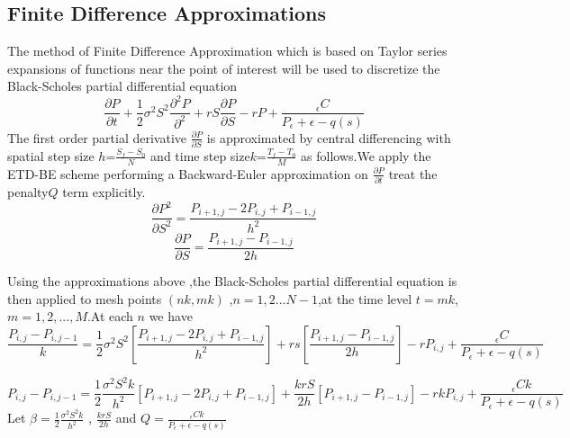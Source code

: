 \documentclass[12pt]{article}
\numberwithin{equation}{section} %
\begin{document}
\subsection{Finite Difference Approximations}
 The method  of Finite Difference Approximation which is based on Taylor series expansions
of functions near the point of interest will be used to discretize
the Black-Scholes partial differential equation\cite{Wilmot}
\begin{equation}
\frac{\partial P}{\partial t}+\frac{1}{2}\sigma^2
S^2\frac{\partial^2 P}{\partial ^2}+rS\frac{\partial P}{\partial
S}-rP +\frac{_{\epsilon}C}{P_{\epsilon}+\epsilon-q(s)}
\end{equation}
 The first order partial derivative $\frac{\partial P}{\partial S}$ is approximated by central differencing
 with spatial step size $h$=$\frac{S_{f}-S_{0}}{N}$ and time step size$k$=$\frac{T_{f}-T_{0}}{M}$ as
 follows.We apply the ETD-BE scheme  performing  a Backward-Euler approximation on
 $\frac{\partial P}{\partial t}$ treat the penalty$Q$ term explicitly.
 \begin{equation*}
\frac{\partial P^2}{\partial
S^2}=\frac{P_{i+1,j}-2P_{i,j}+P_{i-1,j}}{h^2}
 \end{equation*}
 \vspace{10mm}
  \begin{equation*}
\frac{\partial P}{\partial S}=\frac{P_{i+1,j}-P_{i-1,j}}{2h}
 \end{equation*}



 Using the approximations above ,the Black-Scholes partial differential
 equation is then applied to mesh points $(nk,mk)$ ,$n=1,2...N-1$,at
 the time level $t=mk$,$m=1,2,...,M$.At each $n$ we have
 \begin{equation*}
  \frac{P_{i,j}-P_{i,j-1}}{k}=\frac{1}{2}\sigma^2S^2\left[\frac{P_{i+1,j}-2P_{i,j}+P_{i-1,j}}{h^2}\right]+rs\left[\frac{P_{i+1,j}-P_{i-1,j}}{2h}\right]-rP_{i,j}+\frac{_{\epsilon}C}{P_{\epsilon}+\epsilon-q(s)}
 \end{equation*}

  \begin{equation*}
P_{i,j}-P_{i,j-1}=\frac{1}{2}\frac{\sigma^2S^2k}{h^2}\left[
P_{i+1,j}-2P_{i,j}+P_{i-1,j}\right]+\frac{krS}{2h}\left[
P_{i+1,j}-P_{i-1,j}\right]-rkP_{i,j}+\frac{_{\epsilon}Ck}{P_{\epsilon}+\epsilon-q(s)}
 \end{equation*}
 Let $\beta=\frac{1}{2}\frac{\sigma^2S^2k}{h^2}$ , $\frac{krS}{2h}$
 and $Q=\frac{_{\epsilon}Ck}{P_{\epsilon}+\epsilon-q(s)}$
\end{document}

